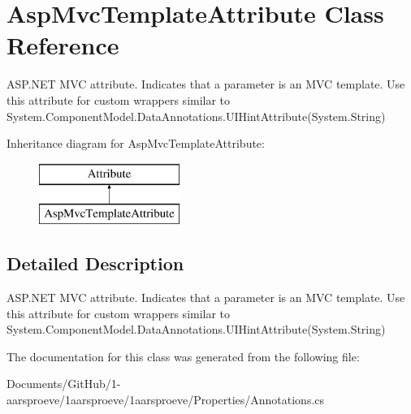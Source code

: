 \hypertarget{class_asp_mvc_template_attribute}{}\section{Asp\+Mvc\+Template\+Attribute Class Reference}
\label{class_asp_mvc_template_attribute}


A\+S\+P.\+N\+E\+T M\+V\+C attribute. Indicates that a parameter is an M\+V\+C template. Use this attribute for custom wrappers similar to {\ttfamily System.\+Component\+Model.\+Data\+Annotations.\+U\+I\+Hint\+Attribute(System.\+String)}  


Inheritance diagram for Asp\+Mvc\+Template\+Attribute\+:\begin{figure}[H]
\begin{center}
\leavevmode
\includegraphics[height=2.000000cm]{class_asp_mvc_template_attribute}
\end{center}
\end{figure}


\subsection{Detailed Description}
A\+S\+P.\+N\+E\+T M\+V\+C attribute. Indicates that a parameter is an M\+V\+C template. Use this attribute for custom wrappers similar to {\ttfamily System.\+Component\+Model.\+Data\+Annotations.\+U\+I\+Hint\+Attribute(System.\+String)} 



The documentation for this class was generated from the following file\+:\begin{DoxyCompactItemize}
\item 
Documents/\+Git\+Hub/1-\/aarsproeve/1aarsproeve/1aarsproeve/\+Properties/Annotations.\+cs\end{DoxyCompactItemize}

